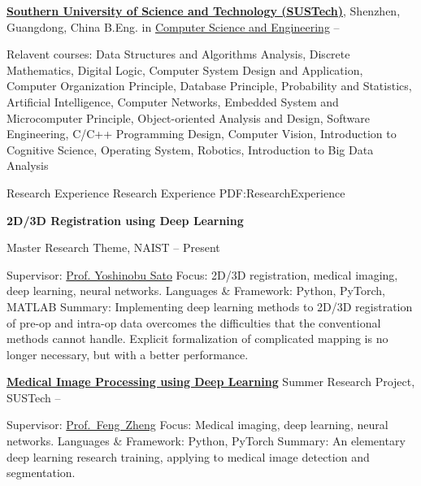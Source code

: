 \documentclass[a4paper,MMMyyyy,nonstopmode]{simpleresumecv}
\begin{document}
\begin{Body}
    \Entry
    \href{https://www.sustech.edu.cn/}
    {\textbf{Southern University of Science and Technology (SUSTech)}},
    Shenzhen, Guangdong, China
    \Gap
    \BulletItem
    B.Eng. in
    \href{http://cse.sustech.edu.cn/}
    {Computer Science and Engineering}
    \hfill
     --
    \begin{Detail}
        \SubBulletItem
        Relavent courses:
        Data Structures and Algorithms Analysis,
        Discrete Mathematics,
        Digital Logic,
        Computer System Design and Application,
        Computer Organization Principle,
        Database Principle,
        Probability and Statistics,
        Artificial Intelligence,
        Computer Networks,
        Embedded System and Microcomputer Principle,
        Object-oriented Analysis and Design,
        Software Engineering,
        C/C++ Programming Design,
        Computer Vision,
        Introduction to Cognitive Science,
        Operating System,
        Robotics,
        Introduction to Big Data Analysis
    \end{Detail}


    \Section
    {Research Experience}
    {Research Experience}
    {PDF:ResearchExperience}

    \Entry
    \textbf{2D/3D Registration using Deep Learning}

    \BulletItem
    Master Research Theme, NAIST
    \hfill
     -- Present
    \begin{Detail}
        \SubBulletItem
        Supervisor:
        \href{http://icb-lab.naist.jp/members/yoshi/index.html}{Prof. Yoshinobu Sato}
        \SubBulletItem
        Focus:
        2D/3D registration, medical imaging, deep learning, neural networks.
        \SubBulletItem
        Languages \& Framework: Python, PyTorch, MATLAB
        \SubBulletItem
        Summary:
        Implementing deep learning methods to 2D/3D registration of pre-op and intra-op data overcomes the difficulties that the conventional methods cannot handle. Explicit formalization of complicated mapping is no longer necessary, but with a better performance.
    \end{Detail}

    \Entry
    \href{https://github.com/hackroid/cv-xmp}
    {\textbf{Medical Image Processing using Deep Learning}}
    \BulletItem
    Summer Research Project, SUSTech
    \hfill
     --
    \begin{Detail}
        \SubBulletItem
        Supervisor:
        \href{https://faculty.sustech.edu.cn/fengzheng/en/}{Prof.~Feng~Zheng}
        \SubBulletItem
        Focus:
        Medical imaging, deep learning, neural networks.
        \SubBulletItem
        Languages \& Framework: Python, PyTorch
        \SubBulletItem
        Summary:
        An elementary deep learning research training, applying to medical image detection and segmentation.
    \end{Detail}


\end{Body}
\end{document}

